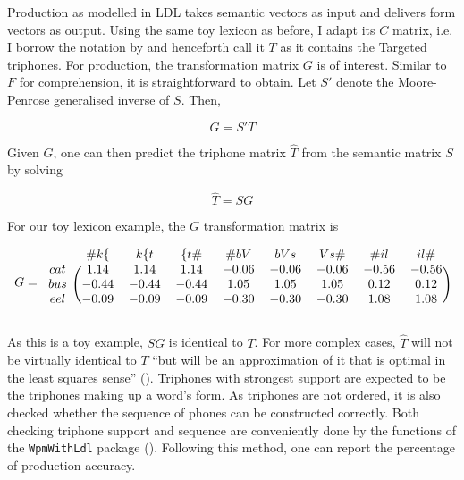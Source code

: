 Production as modelled in LDL takes semantic vectors as input and delivers form vectors as output. Using the same toy lexicon as before, I adapt its $C$ matrix, i.e. I borrow the notation by \citet{Baayen2019} and henceforth call it $T$ as it contains the Targeted triphones. For production, the transformation matrix $G$ is of interest. Similar to $F$ for comprehension, it is straightforward to obtain. Let $S'$ denote the Moore-Penrose generalised inverse of $S$. Then,

\begin{equation}
\label{eq:GST}
    G=S'T
\end{equation}

Given $G$, one can then predict the triphone matrix $\hat{T}$ from the semantic matrix $S$ by solving 

\begin{equation}
\label{eq:TSG}
    \hat{T}=SG
\end{equation}

For our toy lexicon example, the $G$ transformation matrix is 

\begin{equation}
\label{eq:Gmat}
  G = 
    \begin{blockarray}{ccccccccc}
        & {\#k\{} & {k\{t} & {\{t\#} & {\#bV} & {bVs} & {Vs\#} & {\#il} & {il\#} \\
      \begin{block}{c(cccccccc)}
        cat & 1.14 & 1.14 & 1.14 & -0.06 & -0.06 & -0.06 & -0.56 & -0.56 \\
        bus & -0.44 & -0.44 & -0.44 & 1.05 & 1.05 & 1.05 & 0.12 & 0.12 \\
        eel & -0.09 & -0.09 & -0.09 & -0.30 & -0.30 & -0.30 & 1.08 & 1.08 \\
      \end{block}
    \end{blockarray}
\end{equation}

As this is a toy example, $SG$ is identical to $T$. For more complex cases, $\hat{T}$ will not be virtually identical to $T$ “but will be an approximation of it that is optimal in the least squares sense” (\cite[21]{Baayen2019}). Triphones with strongest support are expected to be the triphones making up a word’s form. As triphones are not ordered, it is also checked whether the sequence of phones can be constructed correctly. Both checking triphone support and sequence are conveniently done by the functions of the \texttt{WpmWithLdl} package (\cite{Baayen2019wpm}). Following this method, one can report the percentage of production accuracy.
	
